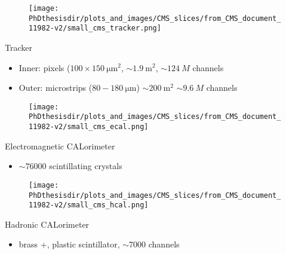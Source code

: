 \begin{frame}
\addtocounter{framenumber}{-1}
\transdissolve
\begin{minipage}[t]{.6\textwidth}
\begin{figure}
\texttt{[image: \\PhDthesisdir/plots\_and\_images/CMS\_slices/from\_CMS\_document\_11982-v2/small\_cms\_tracker.png]}
\end{figure}
\end{minipage}
\hfill\begin{minipage}[t]{.35\textwidth}
\begin{block}{Tracker}
\begin{itemize}
\item Inner: pixels ($\num{100}\times\SI{150}{\micro\meter^2}$, $\sim\SI{1.9}{\meter^2}$, $\sim\SI{124}{M}$ channels
\item Outer: microstrips ($\num{80}-\SI{180}{\micro\meter}$) $\sim\SI{200}{\meter^2}$ $\sim\SI{9.6}{M}$ channels
\end{itemize}
\end{block}
\end{minipage}
\end{frame}

\begin{frame}
\addtocounter{framenumber}{-1}
\transdissolve
\begin{minipage}[t]{.6\textwidth}
\begin{figure}
\texttt{[image: \\PhDthesisdir/plots\_and\_images/CMS\_slices/from\_CMS\_document\_11982-v2/small\_cms\_ecal.png]}
\end{figure}
\end{minipage}
\hfill\begin{minipage}[t]{.35\textwidth}
\begin{block}{Electromagnetic CALorimeter}
\begin{itemize}
\item $\sim\num{76000}$ scintillating  crystals
\end{itemize}
\end{block}
\end{minipage}
\end{frame}

\begin{frame}
\addtocounter{framenumber}{-1}
\transdissolve
\begin{minipage}[t]{.6\textwidth}
\begin{figure}
\texttt{[image: \\PhDthesisdir/plots\_and\_images/CMS\_slices/from\_CMS\_document\_11982-v2/small\_cms\_hcal.png]}
\end{figure}
\end{minipage}
\hfill\begin{minipage}[t]{.35\textwidth}
\begin{block}{Hadronic CALorimeter}
\begin{itemize}
\item brass +, plastic scintillator, $\sim\num{7000}$ channels
\end{itemize}
\end{block}
\end{minipage}
\end{frame}

